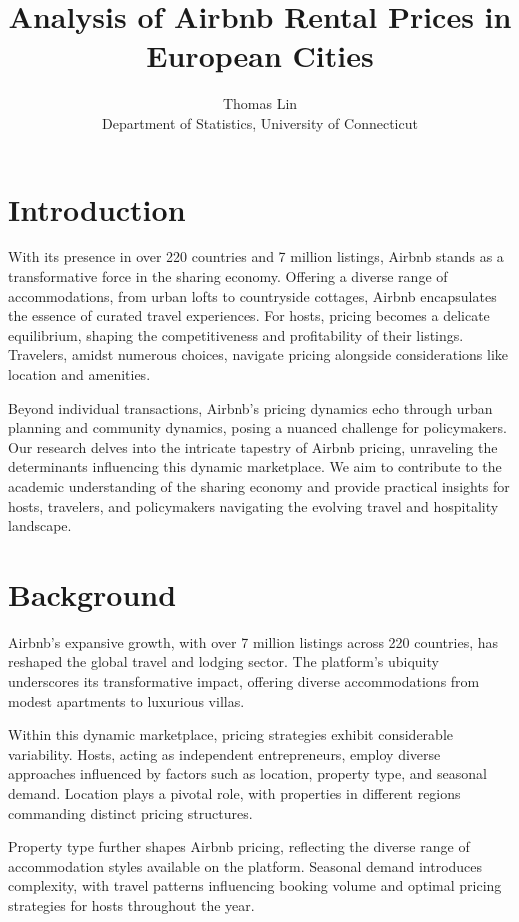 \documentclass[12pt, letterpaper]{article}
\begin{document}
\title{Analysis of Airbnb Rental Prices in European Cities}
\author{Thomas Lin\\
Department of Statistics, University of Connecticut}
\maketitle

\section*{Introduction}
With its presence in over 220 countries and 7 million listings, Airbnb stands as a transformative force in the sharing economy. Offering a diverse range of accommodations, from urban lofts to countryside cottages, Airbnb encapsulates the essence of curated travel experiences. For hosts, pricing becomes a delicate equilibrium, shaping the competitiveness and profitability of their listings. Travelers, amidst numerous choices, navigate pricing alongside considerations like location and amenities.

Beyond individual transactions, Airbnb's pricing dynamics echo through urban planning and community dynamics, posing a nuanced challenge for policymakers. Our research delves into the intricate tapestry of Airbnb pricing, unraveling the determinants influencing this dynamic marketplace. We aim to contribute to the academic understanding of the sharing economy and provide practical insights for hosts, travelers, and policymakers navigating the evolving travel and hospitality landscape.

\section*{Background}
Airbnb's expansive growth, with over 7 million listings across 220 countries, has reshaped the global travel and lodging sector. The platform's ubiquity underscores its transformative impact, offering diverse accommodations from modest apartments to luxurious villas.

Within this dynamic marketplace, pricing strategies exhibit considerable variability. Hosts, acting as independent entrepreneurs, employ diverse approaches influenced by factors such as location, property type, and seasonal demand. Location plays a pivotal role, with properties in different regions commanding distinct pricing structures.

Property type further shapes Airbnb pricing, reflecting the diverse range of accommodation styles available on the platform. Seasonal demand introduces complexity, with travel patterns influencing booking volume and optimal pricing strategies for hosts throughout the year.
\end{document}
